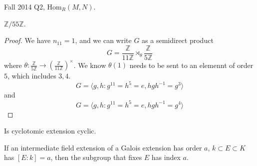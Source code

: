 \documentclass[openany]{book}
\newcommand{\Z}{\mathbb{Z}}
\newcommand{\la}{\langle}
\newcommand{\ra}{\rangle}
\begin{document}
\begin{prob}
    Fall 2014 Q2, $\text{Hom}_R(M,N)$.
\end{prob}





\begin{prob}
    $\Z/55\Z$.
\end{prob}
\begin{proof}
    We have $n_{11}=1$, and we can write $G$ as a semidirect product 
    \begin{equation*}
        G=\frac{\Z}{11\Z}\rtimes_\theta \frac{\Z}{5\Z}
    \end{equation*}
    where $\theta: \frac{\Z}{5\Z}\to\left(\frac{\Z}{11\Z}\right)^\times$. We know $\theta(1)$ needs to be sent to an elemennt of order $5$, which includes $3,4$.
    \begin{equation*}
        G=\la g,h: g^{11}=h^5=e, hgh^{-1}=g^3\ra
    \end{equation*}
    and 
    \begin{equation*}
        G=\la g,h: g^{11}=h^5=e, hgh^{-1}=g^4\ra
    \end{equation*}

\end{proof}


\begin{prob}
    Is cyclotomic extension cyclic.
\end{prob}

\begin{prob}
    If an intermediate field extension of a Galois extension has order $a$, $k\subset E\subset K$ has $[E:k]=a$, then the subgroup that fixes $E$ has index $a$. 
\end{prob}
\end{document}
